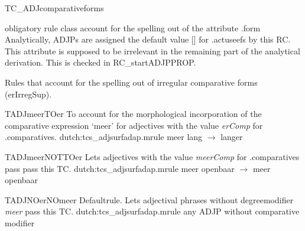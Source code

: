 \begin{mruleclass}{TC\_ADJcomparativeforms}
\begin{classdescr}
\kind obligatory rule class
\classtask account for the spelling out of the attribute .form
\classremarks
Analytically, ADJPs are assigned  the default value [] for .actuseefs 
by this RC. This attribute is supposed to be irrelevant in the remaining part 
of the
analytical derivation. This is checked in RC\_startADJPPROP.
\nofilters

\nospeedrules

\begin{plannedrules}
\item  Rules that account for the spelling 
out of irregular comparative forms (erIrregSup).
\end{plannedrules}

\end{classdescr}
\begin{members}

\begin{member}
 TADJmeerTOer
 To account for the 
morphological incorporation of the comparative expression `meer'
for adjectives with the value {\em erComp} for .comparatives.
\file dutch:tcs\_adjsurfadap.mrule
\semantics \nosemantics
\example meer lang $\rightarrow$ langer 
\remarks\mbox{}

\end{member}
\begin{member}
 TADJmeerNOTTOer
 Lets adjectives with the value {\em meerComp}
for .comparatives pass pass this TC.
\file dutch:tcs\_adjsurfadap.mrule
\semantics \nosemantics
\example meer openbaar  $\rightarrow$ meer openbaar 
\remarks\mbox{}

\end{member}
\begin{member}
 TADJNOerNOmeer
 Defaultrule. Lets adjectival phrases without degreemodifier {\em meer}
pass this TC.
\file dutch:tcs\_adjsurfadap.mrule
\semantics \nosemantics
\example any ADJP without comparative modifier
\remarks\mbox{}

\end{member}
\end{members}
\end{mruleclass}

